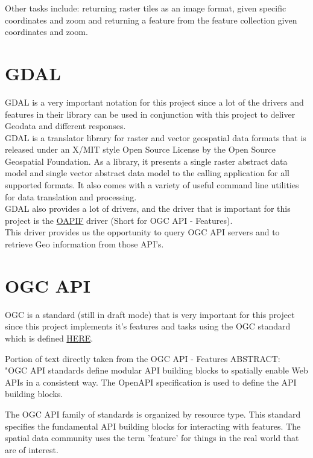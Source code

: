 Other tasks include: returning raster tiles as an image format, given specific coordinates and zoom and returning a feature from the feature collection given coordinates and zoom.

\section{GDAL}
GDAL is a very important notation for this project since a lot of the drivers and features in their library can be used in conjunction with this project to deliver Geodata and different responses.\\
\newline
GDAL is a translator library for raster and vector geospatial data formats that is released under an X/MIT style Open Source License by the Open Source Geospatial Foundation. As a library, it presents a single raster abstract data model and single vector abstract data model to the calling application for all supported formats. It also comes with a variety of useful command line utilities for data translation and processing. \cite{WhatIsGDAL}\\
GDAL also provides a lot of drivers, and the driver that is important for this project is the \href{https://gdal.org/drivers/vector/oapif.html}{OAPIF} driver (Short for OGC API - Features).\\
This driver provides us the opportunity to query OGC API servers and to retrieve Geo information from those API's.

\newpage
\section{OGC API}
OGC is a standard (still in draft mode) that is very important for this project since this project implements it's features and tasks using the OGC standard which is defined \href{https://docs.opengeospatial.org/DRAFTS/17-069r1.html#webapi}{HERE}.

Portion of text directly taken from the OGC API - Features ABSTRACT:  \cite{OGCApiFeatures}\\
\newline
"OGC API standards define modular API building blocks to spatially enable Web APIs in a consistent way. The OpenAPI specification is used to define the API building blocks.

The OGC API family of standards is organized by resource type. This standard specifies the fundamental API building blocks for interacting with features. The spatial data community uses the term 'feature' for things in the real world that are of interest.

